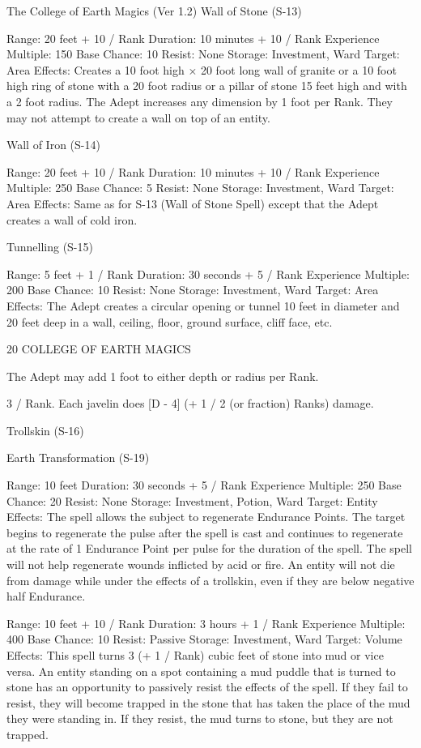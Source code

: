 \begin{Chapter}{The College of Earth Magics (Ver 1.2)}
Wall of Stone (S-13) 

Range: 20 feet + 10 / Rank 
Duration: 10 minutes + 10 / Rank 
Experience Multiple: 150 
Base Chance: 10%
Resist: None 
Storage: Investment, Ward 
Target: Area 
Effects: Creates a 10 foot high × 20 foot long wall 
of granite or a 10 foot high ring of stone with a 20 
foot radius or a pillar of stone 15 feet high and with 
a 2 foot radius. The Adept increases any dimension 
by 1 foot per Rank. They may not attempt to create 
a wall on top of an entity. 

Wall of Iron (S-14) 

Range: 20 feet + 10 / Rank 
Duration: 10 minutes + 10 / Rank 
Experience Multiple: 250 
Base Chance: 5%
Resist: None 
Storage: Investment, Ward 
Target: Area 
Effects:  Same  as  for  S-13  (Wall  of  Stone  Spell) 
except that the Adept creates a wall of cold iron. 

Tunnelling (S-15) 

Range: 5 feet + 1 / Rank 
Duration: 30 seconds + 5 / Rank 
Experience Multiple: 200 
Base Chance: 10%
Resist: None 
Storage: Investment, Ward 
Target: Area 
Effects:  The  Adept  creates  a  circular  opening  or 
tunnel  10  feet  in  diameter  and  20  feet  deep  in  a 
wall,  ceiling,  floor,  ground  surface,  cliff  face,  etc. 

20 COLLEGE OF EARTH MAGICS 

The Adept may add 1 foot to either depth or radius 
per Rank. 

3  /  Rank.  Each  javelin  does  [D  -  4]  (+  1  /  2  (or 
fraction) Ranks) damage. 

Trollskin (S-16) 

Earth Transformation (S-19) 

Range: 10 feet 
Duration: 30 seconds + 5 / Rank 
Experience Multiple: 250 
Base Chance: 20%
Resist: None 
Storage: Investment, Potion, Ward 
Target: Entity 
Effects:  The  spell  allows  the  subject  to  regenerate 
Endurance  Points.  The  target  begins  to  regenerate 
the  pulse  after  the  spell  is  cast  and  continues  to 
regenerate  at  the  rate  of  1  Endurance  Point  per 
pulse  for  the  duration  of  the  spell.  The  spell  will 
not  help  regenerate  wounds  inflicted  by  acid  or 
fire.  An  entity  will  not  die  from  damage  while 
under  the  effects  of  a  trollskin,  even  if  they  are 
below negative half Endurance. 

Range: 10 feet + 10 / Rank 
Duration: 3 hours + 1 / Rank 
Experience Multiple: 400 
Base Chance: 10%
Resist: Passive 
Storage: Investment, Ward 
Target: Volume 
Effects: This spell turns 3 (+ 1 / Rank) cubic feet of 
stone into mud or vice versa. An entity standing on 
a  spot  containing  a  mud  puddle  that  is  turned  to 
stone  has  an  opportunity  to  passively  resist  the 
effects  of  the  spell.  If  they  fail  to  resist,  they  will 
become  trapped  in  the  stone  that  has  taken  the 
place  of  the  mud  they  were  standing  in.  If  they 
resist,  the  mud  turns  to  stone,  but  they  are  not 
trapped. 


\end{Chapter}
